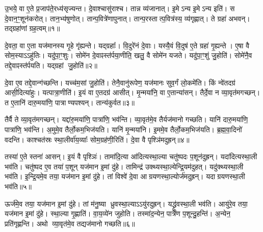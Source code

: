 \clearpage
{}
\setcounter{anuvakam}{0}

उ॒भये॒ वा ए॒ते प्र॒जाप॑ते॒रध्य॑सृज्यन्त।
दे॒वाश्चासु॑राश्च।
तान्न व्य॑जानात्।
इ॒मेऽन्य इ॒मेऽन्य इति॑।
स दे॒वान॒ꣳ॒शून॑करोत्।
तान॒भ्य॑षुणोत्।
तान्प॒वित्रे॑णापुनात्।
तान्प॒रस्तात्प॒वित्र॑स्य॒ व्य॑गृह्णात्।
ते ग्रहा॑ अभवन्।
तद्ग्रहा॑णां ग्रह॒त्वम्॥१॥

दे॒वता॒ वा ए॒ता यज॑मानस्य गृ॒हे गृ॑ह्यन्ते।
यद्ग्रहाः᳚।
वि॒दुरे॑नं दे॒वाः।
यस्यै॒वं वि॒दुष॑ ए॒ते ग्रहा॑ गृ॒ह्यन्ते।
ए॒षा वै सोम॒स्या\-ऽऽहु॑तिः।
यदु॑पा॒ꣳ॒शुः।
सोमे॑न दे॒वाꣴस्त॑र्पया॒णीति॒ खलु॒ वै सोमे॑न यजते।
यदु॑पा॒ꣳ॒शुं जु॒होति॑।
सोमे॑नै॒व तद्दे॒वाꣴस्त॑र्पयति।
यद्ग्रहां जु॒होति॑॥२॥

दे॒वा ए॒व तद्दे॒वान्ग॑च्छन्ति।
यच्च॑म॒सां जु॒होति॑।
तेनै॒वानु॑रूपेण॒ यज॑मानः सुव॒र्गं लो॒कमे॑ति।
किं न्वे॑तदग्र॑ आसी॒दित्या॑हुः।
यत्पात्रा॒णीति॑।
इ॒यं वा ए॒तदग्र॑ आसीत्।
मृ॒न्मया॑नि॒ वा ए॒तान्या॑सन्।
तैर्दे॒वा न व्या॒वृत॑मगच्छन्।
त ए॒तानि॑ दारु॒मया॑णि॒ पात्राण्यपश्यन्।
तान्य॑कुर्वत॥३॥

तैर्वै ते व्या॒वृत॑मगच्छन्।
यद्दा॑रु॒मया॑णि॒ पात्रा॑णि॒ भव॑न्ति।
व्या॒वृत॑मे॒व तैर्यज॑मानो गच्छति।
यानि॑ दारु॒मया॑णि॒ पात्रा॑णि॒ भव॑न्ति।
अ॒मुमे॒व तैर्लो॒कम॒भिज॑यति।
यानि॑ मृ॒न्मया॑नि।
इ॒ममे॒व तैर्लो॒कम॒भिज॑यति।
ब्र॒ह्म॒वा॒दिनो॑ वदन्ति।
काश्चत॑स्रः स्था॒लीर्वा॑य॒व्याः᳚ सोम॒ग्रह॑णी॒रिति॑।
दे॒वा वै पृश्ञि॑मदुह्रन्॥४॥

तस्या॑ ए॒ते स्तना॑ आसन्।
इ॒यं वै पृश्ञिः॑।
तामा॑दि॒त्या आ॑दित्यस्था॒ल्या चतु॑ष्पदः प॒शून॑दुह्रन्।
यदा॑दित्यस्था॒ली भव॑ति।
चतु॑ष्पद ए॒व तया॑ प॒शून् यज॑मान इ॒मां दु॑हे।
तामिन्द्र॑ उक्थ्यस्था॒ल्येन्द्रि॒यम॑दुहत्।
यदु॑क्थ्यस्था॒ली भव॑ति।
इ॒न्द्रि॒यमे॒व तया॒ यज॑मान इ॒मां दु॑हे।
तां विश्वे॑ दे॒वा आग्रयणस्था॒ल्योर्ज॑मदुह्रन्।
यदाग्रयणस्था॒ली भव॑ति॥५॥

ऊर्ज॑मे॒व तया॒ यज॑मान इ॒मां दु॑हे।
तां म॑नु॒ष्या ध्रुवस्था॒ल्या\-ऽऽयु॑रदुह्रन्।
यद्ध्रु॑वस्था॒ली भव॑ति।
आयु॑रे॒व तया॒ यज॑मान इ॒मां दु॑हे।
स्था॒ल्या गृ॒ह्णाति॑।
वा॒य॒व्ये॑न जुहोति।
तस्मा॑द॒न्येन॒ पात्रे॑ण प॒शून्दु॒हन्ति॑।
अ॒न्येन॒ प्रति॑\-गृह्णन्ति।
अथो व्या॒वृत॑मे॒व तद्यज॑मानो गच्छति॥६॥\anuvakamend[ग्र॒ह॒त्वं ग्रहां जु॒होत्य॑कुर्वतादुह्रन्नाग्रयणस्था॒ली भव॑ति॒ नव॑ च]

